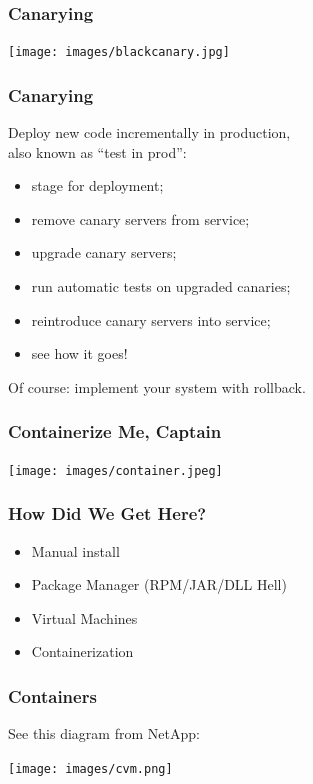 \begin{frame}
\frametitle{Canarying}

\begin{center}
	\texttt{[image: images/blackcanary.jpg]}
\end{center}

\end{frame}



\begin{frame}
\frametitle{Canarying}

\large

Deploy new code incrementally in production, \\
also known as ``test in prod'':


\begin{itemize}
\item stage for deployment;
\item remove canary servers from service;
\item upgrade canary servers;
\item run automatic tests on upgraded canaries;
\item reintroduce canary servers into service;
\item see how it goes!
\end{itemize}

Of course: implement your system with rollback.


\end{frame}







\begin{frame}
\frametitle{Containerize Me, Captain}

\begin{center}
	\texttt{[image: images/container.jpeg]}
\end{center}

\end{frame}


\begin{frame}
\frametitle{How Did We Get Here?}

\begin{itemize}
	\item Manual install
	\item Package Manager (RPM/JAR/DLL Hell)
	\item Virtual Machines
	\item Containerization
\end{itemize}


\end{frame}


\begin{frame}
\frametitle{Containers}

See this diagram from NetApp:

\begin{center}
	\texttt{[image: images/cvm.png]}
\end{center}


\end{frame}







